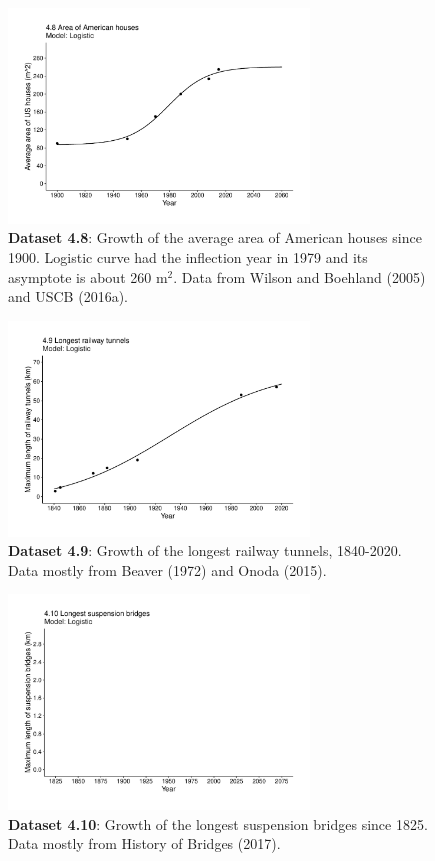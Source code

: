 \documentclass[aps,rmp,preprint,superscriptaddress,10pt,onecolumn]{article}
\begin{document}
\begin{figure}[h]
\includegraphics[width=8cm]{output/figs-ggplot/4.8.pdf}
\caption{\textbf{Dataset 4.8}: Growth of the average area of American houses since 1900. Logistic curve had the inflection year in 1979 and its asymptote is about 260 m$^2$. Data from Wilson and Boehland (2005) and USCB (2016a).}
\end{figure}
	
\begin{figure}[h]
\includegraphics[width=8cm]{output/figs-ggplot/4.9.pdf}
\caption{\textbf{Dataset 4.9}: Growth of the longest railway tunnels, 1840-2020. Data mostly from Beaver (1972) and Onoda (2015).}
\end{figure}
	
\begin{figure}[h]
\includegraphics[width=8cm]{output/figs-ggplot/4.10.pdf}
\caption{\textbf{Dataset 4.10}: Growth of the longest suspension bridges since 1825. Data mostly from History of Bridges (2017).}
\end{figure}
	
\end{document}
